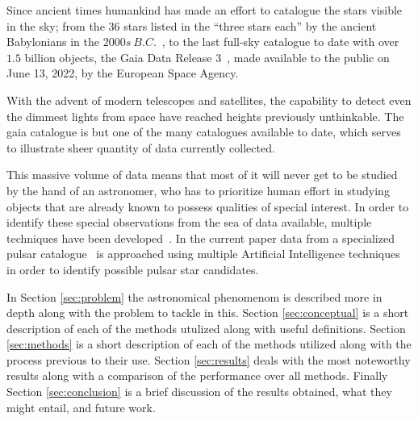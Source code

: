 Since ancient times humankind has made an effort to catalogue the stars visible
in the sky; from the $36$ stars listed in the ``three stars each'' by the
ancient Babylonians in the $2000s\ B.C.$~\cite{astronomy:history:north}, to the
last full-sky catalogue to date with over $1.5$ billion objects, the Gaia Data
Release 3~\cite{gaia:dr3:esa}, made available to the public on June 13, 2022, by
the European Space Agency.

With the advent of modern telescopes and satellites, the capability to detect
even the dimmest lights from space have reached heights previously unthinkable.
The gaia catalogue is but one of the many catalogues available to date, which
serves to illustrate sheer quantity of data currently collected. 

This massive volume of data means that most of it will never get to be studied
by the hand of an astronomer, who has to prioritize human effort in
studying objects that are already known to possess qualities of special interest.
In order to identify these special observations from the sea of data available,
multiple techniques have been developed~\cite{pulsar:dataset:explanation:lyon}.
In the current paper data from a specialized pulsar
catalogue~\cite{pulsar:dataset:lyon} is approached using multiple Artificial
Intelligence techniques in order to identify possible pulsar star candidates.

In Section \ref{sec:problem} the astronomical phenomenom is described more in
depth along with the problem to tackle in this. Section \ref{sec:conceptual} is
a short description of each of the methods utulized along with useful
definitions. Section \ref{sec:methods} is a short description of each of the
methods utilized along with the process previous to their use. Section
\ref{sec:results} deals with the most noteworthy results along with a comparison
of the performance over all methods. Finally Section \ref{sec:conclusion} is a
brief discussion of the results obtained, what they might entail, and future
work.